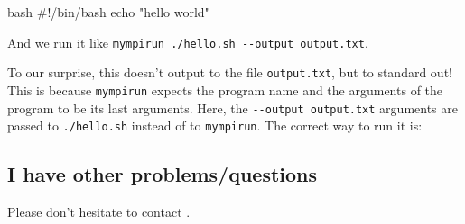 \begin{code}{bash}
#!/bin/bash
echo "hello world"
\end{code}

And we run it like \lstinline|mympirun ./hello.sh --output output.txt|.

To our surprise, this doesn't output to the file \lstinline|output.txt|, but to standard out!
This is because \lstinline|mympirun| expects the program name and the arguments of the program to
be its last arguments. Here, the \lstinline|--output output.txt| arguments are passed to
\lstinline|./hello.sh| instead of to \lstinline|mympirun|. The correct way to run it is:

\begin{prompt}
\end{prompt}



\subsection{I have other problems/questions}

Please don't hesitate to contact \hpcinfo.

